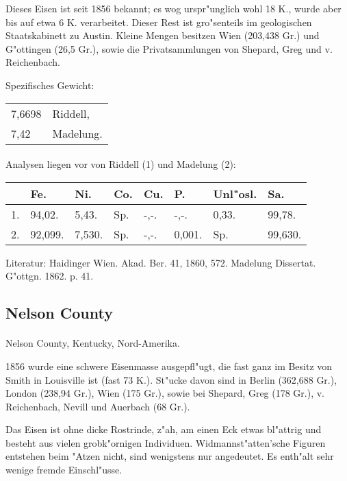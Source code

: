 \documentclass[a4paper, 11pt, oneside]{article}
\begin{document}
Dieses Eisen ist seit 1856 bekannt; es wog urspr"unglich wohl 18 K., wurde aber bis auf etwa 6 K. verarbeitet. Dieser Rest ist gro"senteils im geologischen Staatskabinett zu Austin. Kleine Mengen besitzen Wien (203,438 Gr.) und G"ottingen (26,5 Gr.), sowie die Privatsammlungen von Shepard, Greg und v. Reichenbach.

Spezifisches Gewicht:  
\begin{table}[!ht]
    \centering
    \begin{tabular}{l l}
        7,6698 & Riddell,\\
        7,42 & Madelung.
    \end{tabular}
\end{table}
\paragraph{}
Analysen liegen vor von Riddell (1) und Madelung (2):
\begin{table}[H]
    \centering
    \begin{tabular}{l l l l l l l l}
         & Fe. & Ni. & Co. & Cu. & P. & Unl"osl. & Sa. \\ \hline
        1. & 94,02. & 5,43. & Sp. & -,-. & -,-. & 0,33. & 99,78. \\
        2. & 92,099. & 7,530. & Sp. & -,-. & 0,001. & Sp. & 99,630. \\
    \end{tabular}
\end{table}

\footnotesize
Literatur: Haidinger Wien. Akad. Ber. 41, 1860, 572. Madelung Dissertat. G"ottgn. 1862. p. 41.

\subsection{Nelson County}
\normalsize
\paragraph{}
Nelson County, Kentucky, Nord-Amerika.

1856 wurde eine schwere Eisenmasse ausgepfl"ugt, die fast ganz im Besitz von Smith in Louisville ist (fast 73 K.). St"ucke davon sind in Berlin (362,688 Gr.), London (238,94 Gr.), Wien (175 Gr.), sowie bei Shepard, Greg (178 Gr.), v. Reichenbach, Nevill und Auerbach (68 Gr.).

Das Eisen ist ohne dicke Rostrinde, z"ah, am einen Eck etwas bl"attrig und besteht aus vielen grobk"ornigen Individuen. Widmannst"atten'sche Figuren entstehen beim "Atzen nicht, sind wenigstens nur angedeutet. Es enth"alt sehr wenige fremde Einschl"usse.
\end{document}
